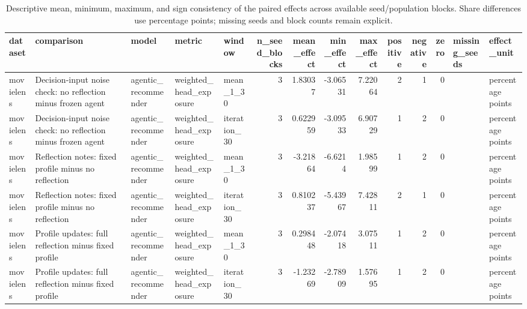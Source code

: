\begin{table}[htbp!]
\centering
\small
\setlength{\tabcolsep}{3pt}
\renewcommand{\arraystretch}{1.1}
\begin{tabular}{lllllrrrrrrrll}
\hline
dataset & comparison & model & metric & window & n\_seed\_blocks & mean\_effect & min\_effect & max\_effect & positive & negative & zero & missing\_seeds & effect\_unit \\
\hline
movielens & Decision-input noise check: no reflection minus frozen agent & agentic\_recommender & weighted\_head\_exposure & mean\_1\_30 & 3 & 1.83037 & -3.06531 & 7.22064 & 2 & 1 & 0 &  & percentage points \\
movielens & Decision-input noise check: no reflection minus frozen agent & agentic\_recommender & weighted\_head\_exposure & iteration\_30 & 3 & 0.622959 & -3.09533 & 6.90729 & 1 & 2 & 0 &  & percentage points \\
movielens & Reflection notes: fixed profile minus no reflection & agentic\_recommender & weighted\_head\_exposure & mean\_1\_30 & 3 & -3.21864 & -6.6214 & 1.98599 & 1 & 2 & 0 &  & percentage points \\
movielens & Reflection notes: fixed profile minus no reflection & agentic\_recommender & weighted\_head\_exposure & iteration\_30 & 3 & 0.810237 & -5.43967 & 7.42811 & 2 & 1 & 0 &  & percentage points \\
movielens & Profile updates: full reflection minus fixed profile & agentic\_recommender & weighted\_head\_exposure & mean\_1\_30 & 3 & 0.298448 & -2.07418 & 3.07511 & 1 & 2 & 0 &  & percentage points \\
movielens & Profile updates: full reflection minus fixed profile & agentic\_recommender & weighted\_head\_exposure & iteration\_30 & 3 & -1.23269 & -2.78909 & 1.57695 & 1 & 2 & 0 &  & percentage points \\
\hline
\end{tabular}
\caption{Descriptive mean, minimum, maximum, and sign consistency of the paired effects across available seed/population blocks. Share differences use percentage points; missing seeds and block counts remain explicit.}
\label{chap:results:tab:rq3_seed_consistency_weighted_head_exposure}
\end{table}
